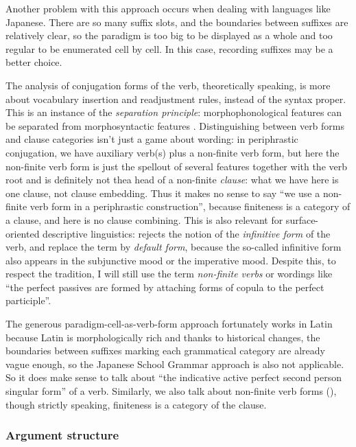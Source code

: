 \documentclass[a4paper, oneside, 12pt]{report}
\newcommand*{\citepage}[1]{p.~{#1}}
\newcommand*{\term}[1]{\emph{#1}}
\begin{document}
{Another problem with this approach occurs 
when dealing with languages like Japanese.
There are so many suffix slots,
and the boundaries between suffixes are relatively clear,
so the paradigm is too big to be displayed as a whole
and too regular to be enumerated cell by cell.
In this case, recording suffixes may be a better choice.

The analysis of conjugation forms of the verb, theoretically speaking,
is more about vocabulary insertion and readjustment rules,
instead of the syntax proper.
This is an instance of the \emph{separation principle}:
morphophonological features can be separated from morphosyntactic features
\citep{embick2000features}.
Distinguishing between verb forms and clause categories isn't just a game about wording:
in periphrastic conjugation,
we have auxiliary verb(s) plus a non-finite verb form,
but here the non-finite verb form is just the spellout of several features together with the verb root 
and is definitely not thea head of a non-finite \emph{clause}:
what we have here is one clause, not clause embedding.
Thus it makes no sense to say ``we use a non-finite verb form in a periphrastic construction'',
because finiteness is a category of a clause,
and here is no clause combining.
This is also relevant for surface-oriented descriptive linguistics:
\citet[\citepage{74,83}]{cgel} rejects the notion of the \term{infinitive form} of the verb,
and replace the term by \term{default form},
because the so-called infinitive form also appears in the subjunctive mood
or the imperative mood. 
Despite this, to respect the tradition, 
I will still use the term \term{non-finite verbs} 
or wordings like ``the perfect passives are formed by attaching forms of copula to the perfect participle''.

The generous paradigm-cell-as-verb-form approach fortunately works in Latin 
because Latin is morphologically rich
and thanks to historical changes,
the boundaries between suffixes marking each grammatical category 
are already vague enough, so the Japanese School Grammar approach is also not applicable. 
So it does make sense to talk about 
``the indicative active perfect second person singular form'' of a verb.
Similarly, we also talk about non-finite verb forms (),
though strictly speaking, finiteness is a category of the clause.

\subsubsection{Argument structure}\label{sec:a-position}

}
\end{document}
